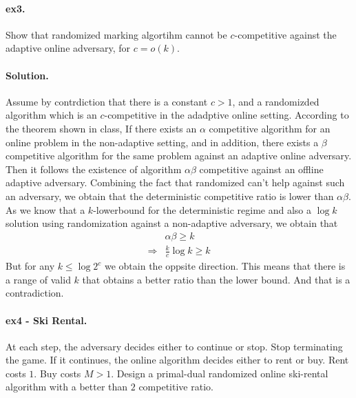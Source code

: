\documentclass{article}
\begin{document}
\begin{multicols*}{2}
  \paragraph{ex3.} Show that randomized marking algortihm cannot be $c$-competitive against the adaptive online adversary, for $c=o\left( k \right)$. 
  \paragraph{Solution.} Assume by contrdiction that there is a constant $c> 1$, and a randomizded algorithm which is an $c$-competitive in the adadptive online setting. According to the theorem shown in class, If there exists an $\alpha$ competitive algorithm for an online problem in the non-adaptive setting, and in addition, there exists a $\beta$ competitive algorithm for the same problem against an adaptive online adversary. Then it follows the existence of algorithm $\alpha\beta$ competitive against an offline adaptive adversary. 
  Combining the fact that randomized can't help against such an adversary, we obtain that the deterministic competitive ratio is lower than $\alpha\beta$. As we know that a $k$-lowerbound for the deterministic regime and also a $\log k$ solution using randomization against a non-adaptive adversary, we obtain that      
  \begin{equation*}
    \begin{split}
      & \alpha\beta \ge k \\ 
      \Rightarrow  & \frac{k}{c}\log k \ge k 
    \end{split}
  \end{equation*} But for any $ k \le \log 2^{c} $ we obtain the oppsite direction. This means that there is a range of valid $k$ that obtains a better ratio than the lower bound. And that is a contradiction.   

  \paragraph{ex4 - Ski Rental.} At each step, the adversary decides either to continue or stop. Stop terminating the game. If it continues, the online algorithm decides either to rent or buy. Rent costs $1$. Buy costs $M > 1$. Design a primal-dual randomized online ski-rental algorithm with a better than $2$ competitive ratio.  

\end{multicols*}
\end{document}
